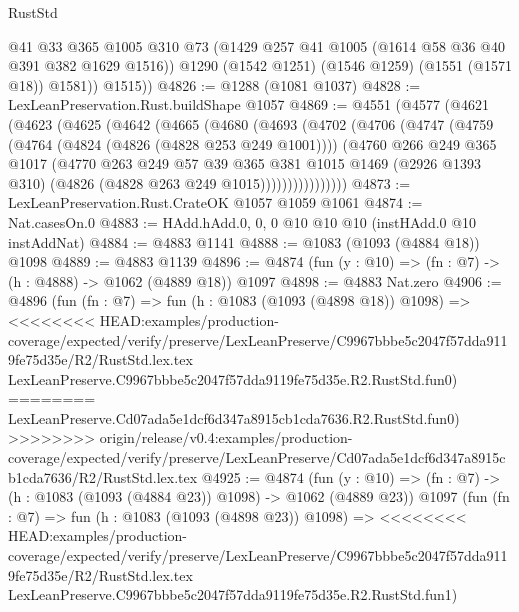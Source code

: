 \begin{lexlean}{RustStd}
\begin{coremodule}
{\begin{coremodule}
{{{{{{{{{{            @41
            @33
            @365
            @1005
            @310
            @73
            (@1429 @257 @41 @1005 (@1614 @58 @36 @40 @391 @382 @1629 @1516))
            @1290
            (@1542 @1251)
            (@1546 @1259)
            (@1551 (@1571 @18))
            @1581))
        @1515))
@4826 := @1288 (@1081 @1037)
@4828 := LexLeanPreservation.Rust.buildShape @1057
@4869 := @4551
    (@4577
      (@4621
        (@4623
          (@4625
            (@4642
              (@4665
                (@4680
                  (@4693
                    (@4702
                      (@4706
                        (@4747
                          (@4759
                            (@4764 (@4824 (@4826 (@4828 @253 @249 @1001))))
                            (@4760
                              @266
                              @249
                              @365
                              @1017
                              (@4770
                                @263
                                @249
                                @57
                                @39
                                @365
                                @381
                                @1015
                                @1469
                                (@2926 @1393 @310)
                                (@4826 (@4828 @263 @249 @1015))))))))))))))))
@4873 := LexLeanPreservation.Rust.CrateOK @1057 @1059 @1061
@4874 := Nat.casesOn.{0}
@4883 := HAdd.hAdd.{0, 0, 0} @10 @10 @10 (instHAdd.{0} @10 instAddNat)
@4884 := @4883 @1141
@4888 := @1083 (@1093 (@4884 @18)) @1098
@4889 := @4883 @1139
@4896 := @4874 (fun (y : @10) => (fn : @7) -> (h : @4888) -> @1062 (@4889 @18)) @1097
@4898 := @4883 Nat.zero
@4906 := @4896
    (fun (fn : @7) =>
    fun (h : @1083 (@1093 (@4898 @18)) @1098) =>
<<<<<<<< HEAD:examples/production-coverage/expected/verify/preserve/LexLeanPreserve/C9967bbbe5c2047f57dda9119fe75d35e/R2/RustStd.lex.tex
    LexLeanPreserve.C9967bbbe5c2047f57dda9119fe75d35e.R2.RustStd.fun0)
========
    LexLeanPreserve.Cd07ada5e1dcf6d347a8915cb1cda7636.R2.RustStd.fun0)
>>>>>>>> origin/release/v0.4:examples/production-coverage/expected/verify/preserve/LexLeanPreserve/Cd07ada5e1dcf6d347a8915cb1cda7636/R2/RustStd.lex.tex
@4925 := @4874
    (fun (y : @10) => (fn : @7) -> (h : @1083 (@1093 (@4884 @23)) @1098) -> @1062 (@4889 @23))
    @1097
    (fun (fn : @7) =>
    fun (h : @1083 (@1093 (@4898 @23)) @1098) =>
<<<<<<<< HEAD:examples/production-coverage/expected/verify/preserve/LexLeanPreserve/C9967bbbe5c2047f57dda9119fe75d35e/R2/RustStd.lex.tex
    LexLeanPreserve.C9967bbbe5c2047f57dda9119fe75d35e.R2.RustStd.fun1)
}}}}}}}}}}
\end{coremodule}}
\end{coremodule}
\end{lexlean}
